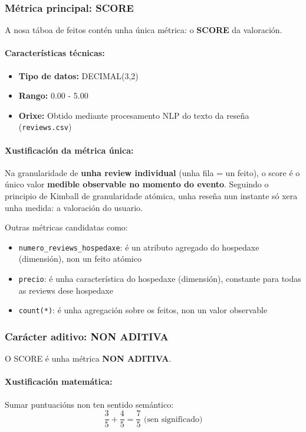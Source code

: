 \documentclass[12pt,a4paper]{article}
\begin{document}
\subsubsection{Métrica principal: SCORE}

A nosa táboa de feitos contén unha única métrica: o \textbf{SCORE} da valoración.

\paragraph{Características técnicas:}
\begin{itemize}
    \item \textbf{Tipo de datos:} DECIMAL(3,2)
    \item \textbf{Rango:} 0.00 - 5.00
    \item \textbf{Orixe:} Obtido mediante procesamento NLP do texto da reseña (\texttt{reviews.csv})
\end{itemize}

\paragraph{Xustificación da métrica única:}

Na granularidade de \textbf{unha review individual} (unha fila = un feito), o score é o único valor \textbf{medible observable no momento do evento}. Seguindo o principio de Kimball de granularidade atómica, unha reseña nun instante só xera unha medida: a valoración do usuario.

Outras métricas candidatas como:
\begin{itemize}
    \item \texttt{numero\_reviews\_hospedaxe}: é un atributo agregado do hospedaxe (dimensión), non un feito atómico
    \item \texttt{precio}: é unha característica do hospedaxe (dimensión), constante para todas as reviews dese hospedaxe
    \item \texttt{count(*)}: é unha agregación sobre os feitos, non un valor observable
\end{itemize}

\subsubsection{Carácter aditivo: NON ADITIVA}

O SCORE é unha métrica \textbf{NON ADITIVA}. 

\paragraph{Xustificación matemática:}
Sumar puntuacións non ten sentido semántico:
$$\frac{3}{5} + \frac{4}{5} = \frac{7}{5} \text{ (sen significado)}$$
\end{document}
